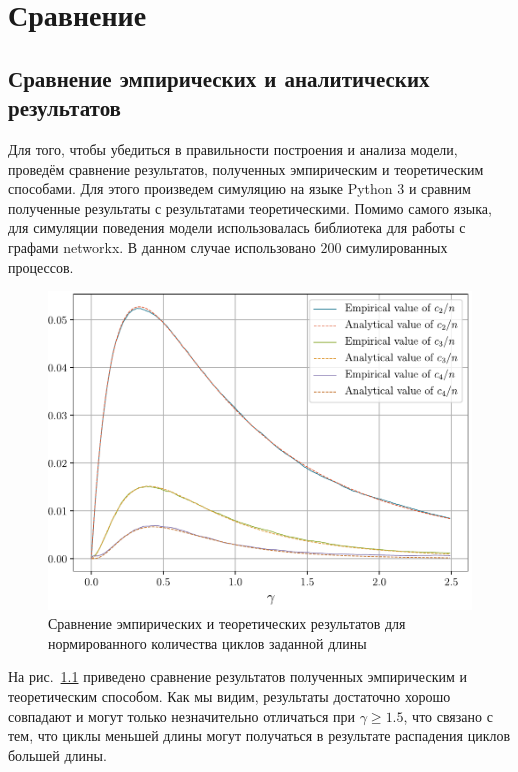 \chapter{Сравнение}

\section{Сравнение эмпирических и аналитических результатов}
Для того, чтобы убедиться в правильности построения и анализа модели, проведём сравнение результатов, полученных эмпирическим и теоретическим способами.
Для этого произведем симуляцию на языке Python 3 и сравним полученные результаты с результатами теоретическими.
Помимо самого языка, для симуляции поведения модели использовалась библиотека для работы с графами networkx.
В данном случае использовано $200$ симулированных процессов.

\begin{figure}[h!]
    \includegraphics[width=0.9\linewidth]{img/cms_1.pdf}
    \caption{Сравнение эмпирических и теоретических результатов для нормированного количества циклов заданной длины}
    \label{cms}
\end{figure}

На рис.~\ref{cms} приведено сравнение результатов полученных эмпирическим и теоретическим способом.
Как мы видим, результаты достаточно хорошо совпадают и могут только незначительно отличаться при $\gamma \geq 1.5$, что связано с тем, что циклы меньшей длины могут получаться в результате распадения циклов большей длины.

